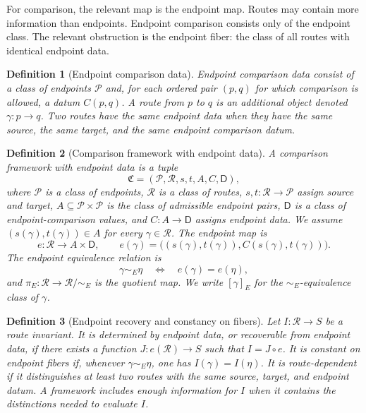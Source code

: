 \documentclass[12pt]{article}
\newtheorem{definition}[definition]{Definition}
\newcommand{\calP}{\mathcal{P}}
\newcommand{\calR}{\mathcal{R}}
\newcommand{\Data}{\mathsf{D}}
\begin{document}
For comparison, the relevant map is the endpoint map. Routes may
contain more information than endpoints. Endpoint comparison consists only
of the endpoint class. The relevant obstruction is the endpoint fiber: the
class of all routes with identical endpoint data.

\begin{definition}[Endpoint comparison data]
\label{def:endpoint-data}
Endpoint comparison data consist of a class of endpoints $\calP$ and,
for each ordered pair $(p,q)$ for which comparison is allowed, a datum
$C(p,q)$. A route from $p$ to $q$ is an additional object denoted
$\gamma:p\to q$. Two routes have the same endpoint data when they have
the same source, the same target, and the same endpoint comparison datum.
\end{definition}

\begin{definition}[Comparison framework with endpoint data]
\label{def:comparison-framework}
A comparison framework with endpoint data is a tuple
\[
  \mathfrak C=(\calP,\calR,s,t,A,C,\Data),
\]
where $\calP$ is a class of endpoints, $\calR$ is a class of routes,
$s,t:\calR\to\calP$ assign source and target, $A\subseteq\calP\times\calP$
is the class of admissible endpoint pairs, $\Data$ is a class of
endpoint-comparison values, and $C:A\to\Data$ assigns endpoint data. We
assume $(s(\gamma),t(\gamma))\in A$ for every $\gamma\in\calR$. The
endpoint map is
\[
  e:\calR\longrightarrow A\times\Data,
  \qquad
  e(\gamma)=\bigl((s(\gamma),t(\gamma)),C(s(\gamma),t(\gamma))\bigr).
\]
The endpoint equivalence relation is
\[
  \gamma\sim_E\eta \quad\Longleftrightarrow\quad e(\gamma)=e(\eta),
\]
and $\pi_E:\calR\to\calR/{\sim_E}$ is the quotient map. We write
$[\gamma]_E$ for the $\sim_E$-equivalence class of $\gamma$.
\end{definition}

\begin{definition}[Endpoint recovery and constancy on fibers]
\label{def:recoverability}
Let $I:\calR\to S$ be a route invariant. It is determined by endpoint
data, or recoverable from endpoint data, if there exists a function
$J:e(\calR)\to S$ such that $I=J\circ e$.
It is constant on endpoint fibers if, whenever $\gamma\sim_E\eta$, one
has $I(\gamma)=I(\eta)$. It is route-dependent if it distinguishes at least
two routes with the same source, target, and endpoint datum. A framework
includes enough information for $I$ when it contains the distinctions
needed to evaluate $I$.
\end{definition}
\end{document}

